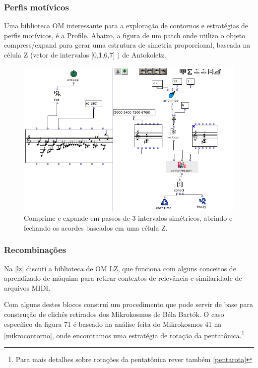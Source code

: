 \documentclass[
	12pt,				%
	openright,			%
	twoside,			%
	a4paper,			%
	english,			%
	french,				%
	spanish,			%
	brazil				%
	]{abntex2}
\begin{document}
\subsubsection{Perfis motívicos}
\label{perfis}

Uma biblioteca OM interessante para a exploração de contornos e estratégias de perfis motívicos, é a Profile. Abaixo, a figura de um patch onde utilizo o objeto compress/expand para gerar uma estrutura de simetria proporcional, baseada na célula Z (vetor de intervalos [0,1,6,7] ) de Antokoletz. 

\begin{figure}[!h]
	\caption{\label{fig_grafico}Comprime e expande em passos de 3 intervalos simétricos, abrindo e fechando os acordes baseados em uma célula Z. }
	\begin{center}
	    \includegraphics[scale=0.6]{OMPD/Profile_celulaZ.png}
	\end{center}
\end{figure}


\subsubsection{Recombinações }

Na \autoref{lz} discuti a biblioteca de OM LZ, que funciona com alguns conceitos de aprendizado de máquina para retirar contextos de relevância e similaridade de arquivos MIDI.

Com alguns destes blocos construí um procedimento que pode servir de base para construção de clichês retirados dos Mikrokosmos de Béla Bartók. O caso específico da figura 71 é baseado na análise feita do Mikrokosmos 41 na \autoref{mikrocontorno}, onde encontramos uma estratégia de rotação da pentatônica.\footnote{Para mais detalhes sobre rotações da pentatônica rever também \autoref{pentarota} }
\end{document}
